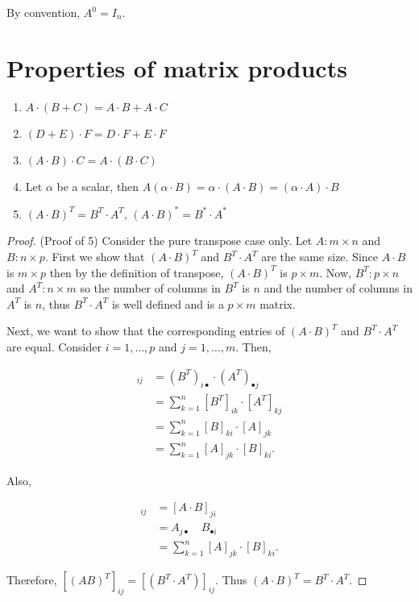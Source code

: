 \documentclass[12pt]{article}
\theoremstyle{definition}
\begin{document}
By convention, $A^0 = I_n$.

\section{Properties of matrix products}

\begin{enumerate}
\item $A \cdot (B + C) = A \cdot B + A \cdot C$
\item $(D + E) \cdot F = D \cdot F + E \cdot F$
\item $(A \cdot B) \cdot C = A \cdot (B \cdot C)$
\item Let $\alpha$ be a scalar, then $A(\alpha \cdot B) = \alpha \cdot (A \cdot B) = (\alpha \cdot A) \cdot B$
\item $(A \cdot B)^T = B^T \cdot A^T$, $(A \cdot B)^* = B^* \cdot A^*$
\end{enumerate}

\begin{proof}
(Proof of 5) Consider the pure transpose case only. Let $A : m \times n$ and $B : n \times p$. First we show that
$(A \cdot B)^T$ and $B^T \cdot A^T$ are the same size. Since $A \cdot B$ is $m \times p$ then by the definition of
transpose, $(A \cdot B)^T$ is $p \times m$. Now, $B^T : p \times n$ and $A^T : n \times m$ so the number of 
columns in $B^T$ is $n$ and the number of columns in $A^T$ is $n$, thus $B^T \cdot A^T$ is well defined and
is a $p \times m$ matrix.

Next, we want to show that the corresponding entries of $(A \cdot B)^T$ and $B^T \cdot A^T$ are equal. Consider
$i = 1, \ldots, p$ and $j = 1, \ldots, m$. Then,

\begin{align*}
[(B^T \cdot A^T)]_{ij} &= (B^T)_{i \bullet} \cdot (A^T)_{\bullet j} \\
&= \sum^{n}_{k=1} [B^T]_{ik} \cdot [A^T]_{kj} \\
&= \sum^{n}_{k=1} [B]_{ki} \cdot [A]_{jk} \\
&= \sum^{n}_{k=1} [A]_{jk} \cdot [B]_{ki}.
\end{align*}

Also,

\begin{align*}
[(A \cdot B)^T]_{ij} &= [A \cdot B]_{ji} \\
&= A_{j \bullet} \quad B_{\bullet i} \\
&= \sum_{k = 1}^{n} [A]_{jk} \cdot [B]_{ki}.
\end{align*}

Therefore, $[(AB)^T]_{ij} = [(B^T \cdot A^T)]_{ij}$. Thus $(A \cdot B)^T = B^T \cdot A^T$.

\end{proof}
\end{document}
